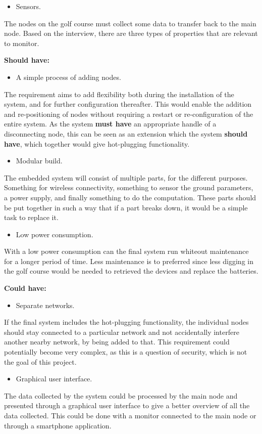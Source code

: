 \begin{itemize}
\item Sensors.
\end{itemize}
The nodes on the golf course must collect some data to transfer back to the main node. Based on the interview, there are three types of properties that are relevant to monitor.


\textbf{Should have:}
\begin{itemize}
\item A simple process of adding nodes.
\end{itemize}
The requirement aims to add flexibility both during the installation of the system, and for further configuration thereafter. This would enable the addition and re-positioning of nodes without requiring a restart or re-configuration of the entire system. As the system \textbf{must have} an appropriate handle of a disconnecting node, this can be seen as an extension which the system \textbf{should have}, which together would give hot-plugging functionality.


\begin{itemize}
\item Modular build.
\end{itemize}
The embedded system will consist of multiple parts, for the different purposes. Something for wireless connectivity, something to sensor the ground parameters, a power supply, and finally something to do the computation. These parts should be put together in such a way that if a part breaks down, it would be a simple task to replace it. 

\begin{itemize}
\item Low power consumption.
\end{itemize}
With a low power consumption can the final system run whiteout maintenance for a longer period of time. Less maintenance is to preferred since less digging in the golf course would be needed to retrieved the devices and replace the batteries.

\textbf{Could have:}
\begin{itemize}
\item Separate networks.
\end{itemize}
If the final system includes the hot-plugging functionality, the individual nodes should stay connected to a particular network and not accidentally interfere another nearby network, by being added to that. This requirement could potentially become very complex, as this is a question of security, which is not the goal of this project. 

\begin{itemize}
\item Graphical user interface.
\end{itemize}
The data collected by the system could be processed by the main node and presented through a graphical user interface to give a better overview of all the data collected. This could be done with a monitor connected to the main node or through a smartphone application.







